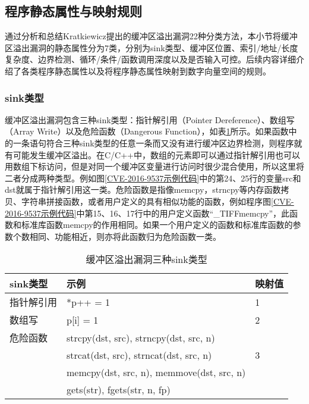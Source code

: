 {\subsection{程序静态属性与映射规则}

通过分析和总结Kratkiewicz提出的缓冲区溢出漏洞22种分类方法，本小节将缓冲区溢出漏洞的静态属性分为7类，分别为sink类型、缓冲区位置、索引/地址/长度复杂度、边界检测、循环/条件/函数调用深度以及是否输入可控。后续内容详细介绍了各类程序静态属性以及将程序静态属性映射到数字向量空间的规则。

\subsubsection{sink类型}

缓冲区溢出漏洞包含三种sink类型：指针解引用（Pointer Dereference）、数组写（Array Write）以及危险函数（Dangerous Function），如表\ref{Description_of_Three_Sink_Types}所示。如果函数中的一条语句符合三种sink类型的任意一条而又没有进行缓冲区边界检测，则程序就有可能发生缓冲区溢出。在C/C++中，数组的元素即可以通过指针解引用也可以用数组下标访问，但是对同一个缓冲区变量进行访问时很少混合使用，所以这里将二者分成两种类型。例如图\ref{CVE-2016-9537示例代码}中的第24、25行的变量src和dst就属于指针解引用这一类。危险函数是指像memcpy，strncpy等内存函数拷贝、字符串拼接函数，或者用户定义的具有相似功能的函数，例如程序图\ref{CVE-2016-9537示例代码}中第15、16、17行中的用户定义函数“\_TIFFmemcpy”，此函数和标准库函数memcpy的作用相同。如果一个用户定义的函数和标准库函数的参数个数相同、功能相近，则亦将此函数归为危险函数一类。

\begin{table}[ht]
\begin{center}
\caption{缓冲区溢出漏洞三种sink类型} \label{Description_of_Three_Sink_Types}
\begin{small}
\begin{tabular}{lll}
\hline
{\bf sink类型} & {\bf 示例} & {\bf 映射值} \\
\hline
指针解引用 & *p++ = 1 &  1\\
\hline
数组写 & p[i] = 1 & 2 \\ \hline
危险函数 & strcpy(dst, src), strncpy(dst, src, n)\\
& strcat(dst, src), strncat(dst, src, n) & 3\\
& memcpy(dst, src, n), memmove(dst, src, n) &\\
& gets(str), fgets(str, n, fp)
 &  \\ \hline
\end{tabular}
\end{small}
\end{center}
\end{table}

}
